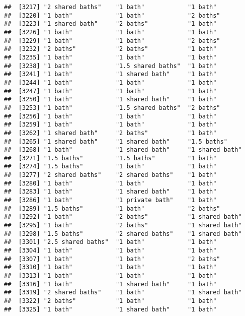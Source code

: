 \documentclass[
]{article}
\begin{document}
\begin{verbatim}
##  [3217] "2 shared baths"    "1 bath"            "1 bath"           
##  [3220] "1 bath"            "1 bath"            "2 baths"          
##  [3223] "1 shared bath"     "2 baths"           "1 bath"           
##  [3226] "1 bath"            "1 bath"            "1 bath"           
##  [3229] "1 bath"            "1 bath"            "2 baths"          
##  [3232] "2 baths"           "2 baths"           "1 bath"           
##  [3235] "1 bath"            "1 bath"            "1 bath"           
##  [3238] "1 bath"            "1.5 shared baths"  "1 bath"           
##  [3241] "1 bath"            "1 shared bath"     "1 bath"           
##  [3244] "1 bath"            "1 bath"            "1 bath"           
##  [3247] "1 bath"            "1 bath"            "1 bath"           
##  [3250] "1 bath"            "1 shared bath"     "1 bath"           
##  [3253] "1 bath"            "1.5 shared baths"  "2 baths"          
##  [3256] "1 bath"            "1 bath"            "1 bath"           
##  [3259] "1 bath"            "1 bath"            "1 bath"           
##  [3262] "1 shared bath"     "2 baths"           "1 bath"           
##  [3265] "1 shared bath"     "1 shared bath"     "1.5 baths"        
##  [3268] "1 bath"            "1 shared bath"     "1 shared bath"    
##  [3271] "1.5 baths"         "1.5 baths"         "1 bath"           
##  [3274] "1.5 baths"         "1 bath"            "1 bath"           
##  [3277] "2 shared baths"    "2 shared baths"    "1 bath"           
##  [3280] "1 bath"            "1 bath"            "1 bath"           
##  [3283] "1 bath"            "1 shared bath"     "1 bath"           
##  [3286] "1 bath"            "1 private bath"    "1 bath"           
##  [3289] "1.5 baths"         "1 bath"            "2 baths"          
##  [3292] "1 bath"            "2 baths"           "1 shared bath"    
##  [3295] "1 bath"            "2 baths"           "1 shared bath"    
##  [3298] "1.5 baths"         "2 shared baths"    "1 shared bath"    
##  [3301] "2.5 shared baths"  "1 bath"            "1 bath"           
##  [3304] "1 bath"            "1 bath"            "1 bath"           
##  [3307] "1 bath"            "1 bath"            "2 baths"          
##  [3310] "1 bath"            "1 bath"            "1 bath"           
##  [3313] "1 bath"            "1 bath"            "1 bath"           
##  [3316] "1 bath"            "1 shared bath"     "1 bath"           
##  [3319] "2 shared baths"    "1 bath"            "1 shared bath"    
##  [3322] "2 baths"           "1 bath"            "1 bath"           
##  [3325] "1 bath"            "1 shared bath"     "1 bath"           

\end{verbatim}
\end{document}
